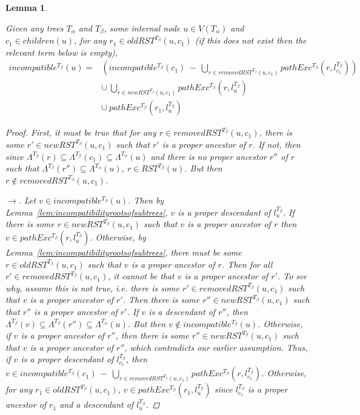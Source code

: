 \documentclass{article}
\newcommand{\leafset}{\Lambda}
\newcommand{\TA}{T_\alpha}
\newcommand{\TB}{T_\beta}
\newtheorem{incompatibilityrecursive}[incompatibility]{Lemma}
\begin{document}
    \begin{incompatibilityrecursive}
        \label{lem:incompatibilityrecursive}

        Given any trees $\TA$ and $\TB$, some internal node $u \in V(\TA)$ and $c_1 \in children(u)$, for any $r_1 \in oldRST^{\TB}(u, c_1)$ (if this does not exist then the relevant term below is empty),
        \begin{align*}
            incompatible^{\TB}(u) = &\left(incompatible^{\TB}(c_1)\ -\ \bigcup_{r \in removedRST^{\TB}(u, c_1)} pathExc^{\TB}(r, l_{c_1}^{\TB})\right)\\
            &\cup\ \bigcup_{r \in newRST^{\TB}(u, c_1)} pathExc^{\TB}(r, l_u^{\TB})\\
            &\cup\ pathExc^{\TB}(r_1, l_u^{\TB})
        \end{align*}

        \begin{proof}
            First, it must be true that for any $r \in removedRST^{\TB}(u, c_1)$, there is some $r' \in newRST^{\TB}(u, c_1)$ such that $r'$ is a proper ancestor of $r$. If not, then since $\leafset^{\TB}(r) \subseteq \leafset^{\TB}(c_1) \subseteq \leafset^{\TA}(u)$ and there is no proper ancestor $r''$ of $r$ such that $\leafset^{\TB}(r'') \subseteq \leafset^{\TA}(u)$, $r \in RST^{\TB}(u)$. But then $r \not\in removedRST^{\TB}(u, c_1)$.

            $\longrightarrow$. Let $v \in incompatible^{\TB}(u)$. Then by Lemma~\ref{lem:incompatibilityrootsofsubtrees}, $v$ is a proper descendant of $l_u^{\TB}$. If there is some $r \in newRST^{\TB}(u, c_1)$ such that $v$ is a proper ancestor of $r$ then $v \in pathExc^{\TB}(r, l_u^{\TB})$. Otherwise, by Lemma~\ref{lem:incompatibilityrootsofsubtrees}, there must be some $r \in oldRST^{\TB}(u, c_1)$ such that $v$ is a proper ancestor of $r$. Then for all $r' \in removedRST^{\TB}(u, c_1)$, it cannot be that $v$ is a proper ancestor of $r'$. To see why, assume this is not true, i.e. there is some $r' \in removedRST^{\TB}(u, c_1)$ such that $v$ is a proper ancestor of $r'$. Then there is some $r'' \in newRST^{\TB}(u, c_1)$ such that $r''$ is a proper ancestor of $r'$. If $v$ is a descendant of $r''$, then $\leafset^{\TB}(v) \subseteq \leafset^{\TB}(r'') \subseteq \leafset^{\TA}(u)$. But then $v \not\in incompatible^{\TB}(u)$. Otherwise, if $v$ is a proper ancestor of $r''$, then there is some $r'' \in newRST^{\TB}(u, c_1)$ such that $v$ is a proper ancestor of $r''$, which contradicts our earlier assumption. Thus, if $v$ is a proper descendant of $l_{c_1}^{\TB}$, then $v \in incompatible^{\TB}(c_1)\ -\ \bigcup_{r \in removedRST^{\TB}(u, c_1)} pathExc^{\TB}(r, l_{c_1}^{\TB})$. Otherwise, for any $r_1 \in oldRST^{\TB}(u, c_1)$, $v \in pathExc^{\TB}(r_1, l_u^{\TB})$ since $l_{c_1}^{\TB}$ is a proper ancestor of $r_1$ and a descendant of $l_u^{\TB}$.


\end{proof}
\end{incompatibilityrecursive}
\end{document}
